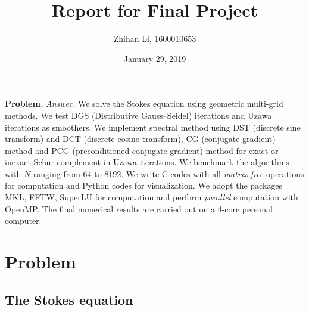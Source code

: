 \documentclass[english, nochinese]{pnote}
\title{Report for Final Project}
\author{Zhihan Li, 1600010653}
\date{January 29, 2019}
\begin{document}
\maketitle

\textbf{Problem.} \textit{Answer.} We solve the Stokes equation using geometric multi-grid methods. We test DGS (Distributive Gauss--Seidel) iterations and Uzawa iterations as smoothers. We implement spectral method using DST (discrete sine transform) and DCT (discrete cosine transform), CG (conjugate gradient) method and PCG (preconditioned conjugate gradient) method for exact or inexact Schur complement in Uzawa iterations. We benchmark the algorithms with $N$ ranging from 64 to 8192. We write C codes with all \emph{matrix-free} operations for computation and Python codes for visualization. We adopt the packages MKL, FFTW, SuperLU for computation and perform \emph{parallel} computation with OpenMP. The final numerical results are carried out on a 4-core personal computer.

\section{Problem}

\subsection{The Stokes equation}
\end{document}
